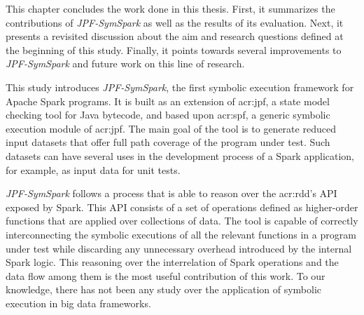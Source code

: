 
This chapter concludes the work done in this thesis. First, it summarizes the contributions of \textit{JPF-SymSpark} as well as the results of its evaluation. Next, it presents a revisited discussion about the aim and research questions defined at the beginning of this study. Finally, it points towards several improvements to \textit{JPF-SymSpark} and future work on this line of research.


This study introduces \textit{JPF-SymSpark}, the first symbolic execution framework for Apache Spark programs. It is built as an extension of \acrfull{acr:jpf}, a state model checking tool for Java bytecode, and based upon \acrfull{acr:spf}, a generic symbolic execution module of \acrshort{acr:jpf}. The main goal of the tool is to generate reduced input datasets that offer full path coverage of the program under test. Such datasets can have several uses in the development process of a Spark application, for example, as input data for unit tests. 

\textit{JPF-SymSpark} follows a process that is able to reason over the \acrshort{acr:rdd}'s API exposed by Spark. This API consists of a set of operations defined as higher-order functions that are applied over collections of data. The tool is capable of correctly interconnecting the symbolic executions of all the relevant functions in a program under test while discarding any unnecessary overhead introduced by the internal Spark logic. This reasoning over the interrelation of Spark operations and the data flow among them is the most useful contribution of this work. To our knowledge, there has not been any study over the application of symbolic execution in big data frameworks.

